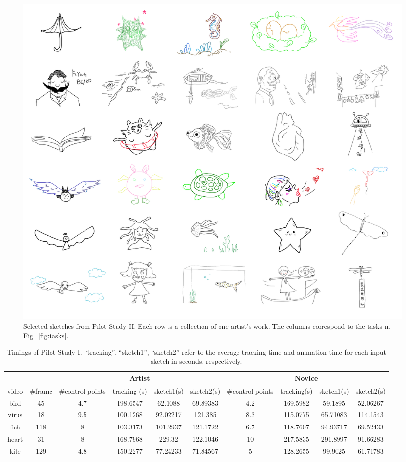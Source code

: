 \begin{figure}
	\centering
	\includegraphics[width=\linewidth]{images/us2sketch2}
	\caption{Selected sketches from Pilot Study II. Each row is a collection of one artist's work. The columns correspond to the tasks in Fig.~\ref{fig:tasks}.}
	\label{fig:us2sketch}
\end{figure}

\begin{table}[]
	\centering
	\caption{Timings of Pilot Study I. ``tracking'', ``sketch1'', ``sketch2'' refer to the average tracking time and animation time for each input sketch in seconds, respectively.}
	\label{table:timings}
	\begin{tabular}{c|c|cccc|cccc}
		\hline
		&         & \multicolumn{4}{c}{Artist}                                  & \multicolumn{4}{|c}{Novice}                                 \\ \hline
		video & \#frame & \#control points & tracking (s) & sketch1(s) & sketch2(s) & \#control points & tracking(s) & sketch1(s) & sketch2(s) \\ \hline
		bird  & 45      & 4.7      			& 198.6547     & 62.1088     & 69.89383    & 4.2         & 169.5982     & 59.1895     & 52.06267    \\
		virus & 18      & 9.5              & 100.1268     & 92.02217    & 121.385     & 8.3         & 115.0775     & 65.71083    & 114.1543    \\
		fish  & 118     & 8                & 103.3173     & 101.2937    & 121.1722    & 6.7         & 118.7607     & 94.93717    & 69.52433    \\
		heart & 31      & 8                & 168.7968     & 229.32      & 122.1046    & 10               & 217.5835     & 291.8997    & 91.66283    \\
		kite  & 129     & 4.8      			& 150.2277     & 77.24233    & 71.84567    & 5                & 128.2655     & 99.9025     & 61.71783    \\ \hline
	\end{tabular}
\end{table}